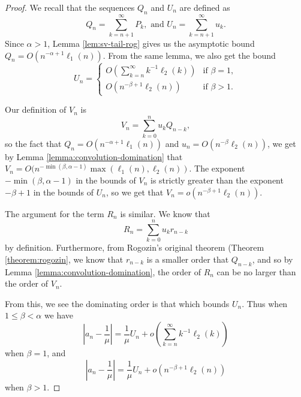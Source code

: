 \begin{proof}
    We recall that the sequences $Q_n$ and $U_n$ are defined as
    \begin{equation}
        Q_n = \sum_{k=n+1}^\infty P_k,
        \text{ and }
        U_n = \sum_{k=n+1}^\infty u_k.
    \end{equation}
    Since $\alpha > 1$, Lemma \ref{lem:sv-tail-rog} gives us the asymptotic bound $Q_n = O(n^{-\alpha + 1}\ell_1(n))$. From the same lemma, we also get the bound
    \begin{equation}
        U_n = \begin{cases}
            O\left(\sum_{k=n}^\infty k^{-1}\ell_2(k)\right) & \text{if } \beta=1,\\
            O(n^{-\beta+1}\ell_2(n)) & \text{if } \beta > 1.
        \end{cases}
    \end{equation}

    Our definition of $V_n$ is 
    \[
        V_n = \sum_{k=0}^n u_k Q_{n-k},
    \]
    so the fact that $Q_n = O(n^{-\alpha+1}\ell_1(n))$ and $u_n = O(n^{-\beta}\ell_2(n))$, we get by Lemma \ref{lemma:convolution-domination} that $V_n = O(n^{-\min(\beta, \alpha-1)}\max(\ell_1(n),\ell_2(n))$. The exponent $-\min(\beta, \alpha-1)$ in the bounds of $V_n$ is strictly greater than the exponent $-\beta+1$ in the bounds of $U_n$, so we get that $V_n = o(n^{-\beta+1}\ell_2(n))$.

    The argument for the term $R_n$ is similar. We know that
    \[
        R_n = \sum_{k=0}^n u_k r_{n-k}
    \]
    by definition. Furthermore, from Rogozin's original theorem (Theorem \ref{theorem:rogozin}, we know that $r_{n-k}$ is a smaller order that $Q_{n-k}$, and so by Lemma \ref{lemma:convolution-domination}, the order of $R_n$ can be no larger than the order of $V_n$.

    From this, we see the dominating order is that which bounds $U_n$. Thus when $1 \leq \beta < \alpha$ we have
    \[
        \left|a_n - \frac{1}{\mu}\right| = \frac{1}{\mu} U_n + o\left(\sum_{k=n}^\infty k^{-1}\ell_2(k)\right)
    \]
    when $\beta = 1$, and
    \[
    \left|a_n - \frac{1}{\mu}\right| = \frac{1}{\mu} U_n + o(n^{-\beta+1}\ell_2(n))
    \]
    when $\beta > 1$.
\end{proof}
